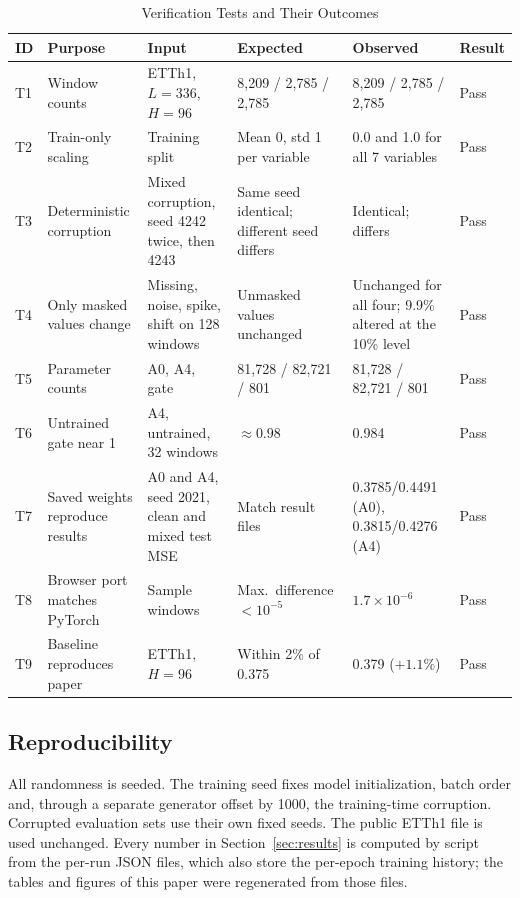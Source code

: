 \begin{table}[!t]
\centering
\caption{Verification Tests and Their Outcomes}
\label{tab:tests}
\footnotesize
\renewcommand{\arraystretch}{1.12}
\begin{tabular}{@{}lp{}p{}p{}p{}l@{}}
\toprule
ID & Purpose & Input & Expected & Observed & Result \\
\midrule
T1 & Window counts & ETTh1, $L=336$, $H=96$ & 8,209 / 2,785 / 2,785 & 8,209 / 2,785 / 2,785 & Pass \\
T2 & Train-only scaling & Training split & Mean 0, std 1 per variable & 0.0 and 1.0 for all 7 variables & Pass \\
T3 & Deterministic corruption & Mixed corruption, seed 4242 twice, then 4243 & Same seed identical; different seed differs & Identical; differs & Pass \\
T4 & Only masked values change & Missing, noise, spike, shift on 128 windows & Unmasked values unchanged & Unchanged for all four; 9.9\% altered at the 10\% level & Pass \\
T5 & Parameter counts & A0, A4, gate & 81,728 / 82,721 / 801 & 81,728 / 82,721 / 801 & Pass \\
T6 & Untrained gate near 1 & A4, untrained, 32 windows & $\approx0.98$ & 0.984 & Pass \\
T7 & Saved weights reproduce results & A0 and A4, seed 2021, clean and mixed test MSE & Match result files & 0.3785/0.4491 (A0), 0.3815/0.4276 (A4) & Pass \\
T8 & Browser port matches PyTorch & Sample windows & Max.\ difference $<10^{-5}$ & $1.7\times10^{-6}$ & Pass \\
T9 & Baseline reproduces paper & ETTh1, $H=96$ & Within 2\% of 0.375 & 0.379 ($+1.1\%$) & Pass \\
\bottomrule
\end{tabular}
\end{table}

\subsection{Reproducibility}

All randomness is seeded. The training seed fixes model initialization, batch order and, through a separate generator offset by 1000, the training-time corruption. Corrupted evaluation sets use their own fixed seeds. The public ETTh1 file is used unchanged. Every number in Section~\ref{sec:results} is computed by script from the per-run JSON files, which also store the per-epoch training history; the tables and figures of this paper were regenerated from those files.
